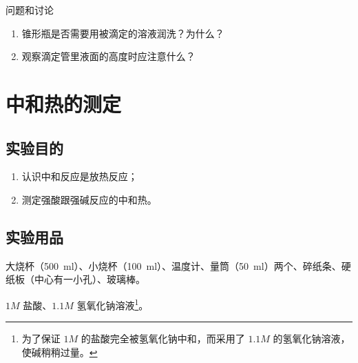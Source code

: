 \begin{Theorem}{问题和讨论}
\begin{enumerate}[1.]
  \item 锥形瓶是否需要用被滴定的溶液润洗？为什么？
  \item 观察滴定管里液面的高度时应注意什么？
\end{enumerate}
\end{Theorem}


\section{中和热的测定}
\subsection*{实验目的}
\begin{enumerate}[1.]
  \item 认识中和反应是放热反应；
  \item 测定强酸跟强碱反应的中和热。
\end{enumerate}
\subsection*{实验用品}
大烧杯（\qty{500}{ml}）、小烧杯（\qty{100}{ml}）、温度计、量筒（\qty{50}{ml}）两个、碎纸条、硬纸板（中心有一小孔）、玻璃棒。

$1M$ 盐酸、$1.1M$ 氢氧化钠溶液\footnote{为了保证 $1M$ 的盐酸完全被氢氧化钠中和，而采用了 $1.1M$ 的氢氧化钠溶液，使碱稍稍过量。}。

